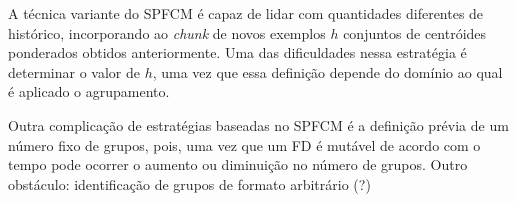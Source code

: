 A técnica variante do SPFCM é capaz de lidar com quantidades diferentes de histórico, incorporando ao \emph{chunk} de novos exemplos $h$ conjuntos de centróides ponderados obtidos anteriormente. Uma das dificuldades nessa estratégia é determinar o valor de $h$, uma vez que essa definição depende do domínio ao qual é aplicado o agrupamento.

Outra complicação de estratégias baseadas no SPFCM é a definição prévia de um número fixo de grupos, pois, uma vez que um FD é mutável de acordo com o tempo pode ocorrer o aumento ou diminuição no número de grupos. Outro obstáculo: identificação de grupos de formato arbitrário (?)

